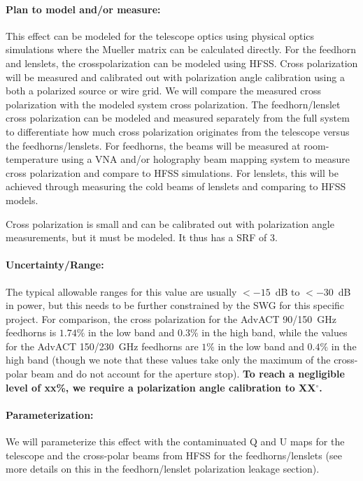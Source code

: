 \paragraph{Plan to model and/or measure:}
This effect can be modeled for the telescope optics using physical optics simulations where the Mueller matrix can be calculated directly. For the feedhorn and lenslets, the crosspolarization can be modeled using HFSS. Cross polarization will be measured and calibrated out with polarization angle calibration using a both a polarized source or wire grid. We will compare the measured cross polarization with the modeled system cross polarization. The feedhorn/lenslet cross polarization can be modeled and measured separately from the full system to differentiate how much cross polarization originates from the telescope versus the feedhorns/lenslets. For feedhorns, the beams will be measured at room-temperature using a VNA and/or holography beam mapping system to measure cross polarization and compare to HFSS simulations. For lenslets, this will be achieved through measuring the cold beams of lenslets and comparing to HFSS models.

Cross polarization is small and can be calibrated out with polarization angle measurements, but it must be modeled. It thus has a SRF of 3.

\paragraph{Uncertainty/Range:}
The typical allowable ranges for this value are usually $<-15$~dB to $<-30$~dB in power, but this needs to be further constrained by the SWG for this specific project. For comparison, the cross polarization for the AdvACT 90/150~GHz feedhorns is $1.74\%$ in the low band and $0.3\%$ in the high band, while the values for the AdvACT 150/230~GHz feedhorns are $1\%$ in the low band and $0.4\%$ in the high band (though we note that these values take only the maximum of the cross-polar beam and do not account for the aperture stop). \textbf{To reach a negligible level of xx\%, we require a polarization angle calibration to XX$^{\circ}$.}

\paragraph{Parameterization:}
We will parameterize this effect with the contaminuated Q and U maps for the telescope and the cross-polar beams from HFSS for the feedhorns/lenslets (see more details on this in the feedhorn/lenslet polarization leakage section).
